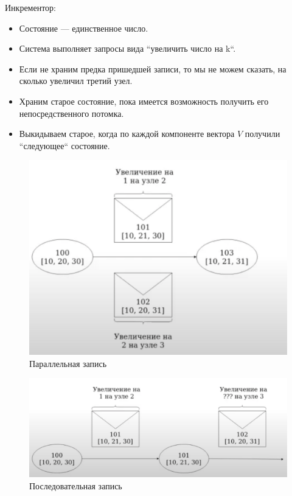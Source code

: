     \begin{example}
      Инкрементор:\\
        \begin{itemize}
          \item Состояние --- единственное число.
          \item Система выполняет запросы вида ``увеличить число на k``.
          \item Если не храним предка пришедшей записи, то мы не можем сказать, на сколько увеличил третий узел.
          \item Храним старое состояние, пока имеется возможность получить его непосредственного потомка.
          \item Выкидываем старое, когда по каждой компоненте вектора $V$ получили ``следующее`` состояние.
      \end{itemize}
      \begin{figure}[h]
                    \centering
                    \includegraphics[scale = 0.5]{../assets/15.png}
                    \caption{Параллельная запись}
    \end{figure}
            \begin{figure}[h]
                          \centering
                          \includegraphics[scale = 0.5]{../assets/16.png}
                          \caption{Последовательная запись}
            \end{figure}
    \end{example}
